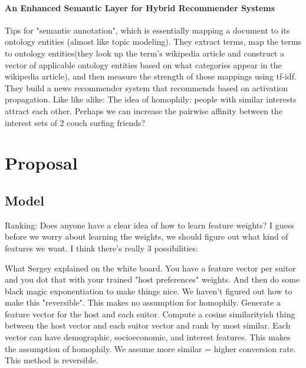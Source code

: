 \documentclass[11pt]{article}
\begin{document}
\paragraph{An Enhanced Semantic Layer for Hybrid Recommender Systems} \cite{Cantador2011}
Tips for "semantic annotation", which is essentially mapping a document to its ontology entities (almost like topic modeling). They extract terms, map the terms to ontology entities(they look up the term's wikipedia article and construct a vector of applicable ontology entities based on what categories appear in the wikipedia article), and then measure the strength of those mappings using tf-idf.
They build a news recommender system that recommends based on activation propagation.
Like like alike:
The idea of homophily: people with similar interests attract each other.  Perhaps we can increase the pairwise affinity between the interest sets of 2 couch surfing friends?

\section{Proposal}
\subsection{Model}
Ranking:
Does anyone have a clear idea of how to learn feature weights?  I guess before we worry about learning the weights, we should figure out what kind of features we want.  I think there's really 3 possibilities:

What Sergey explained on the white board.  You have a feature vector per suitor and you dot that with your trained "host preferences" weights. And then do some black magic exponentiation to make things nice. We haven't figured out how to make this "reversible".  This makes no assumption for homophily.
Generate a feature vector for the host and each suitor. Compute a cosine similarityish thing between the host vector and each suitor vector and rank by most similar. Each vector can have demographic, socioeconomic, and interest features.  This makes the assumption of homophily. We assume more similar = higher conversion rate. This method is reversible.

\end{document}
